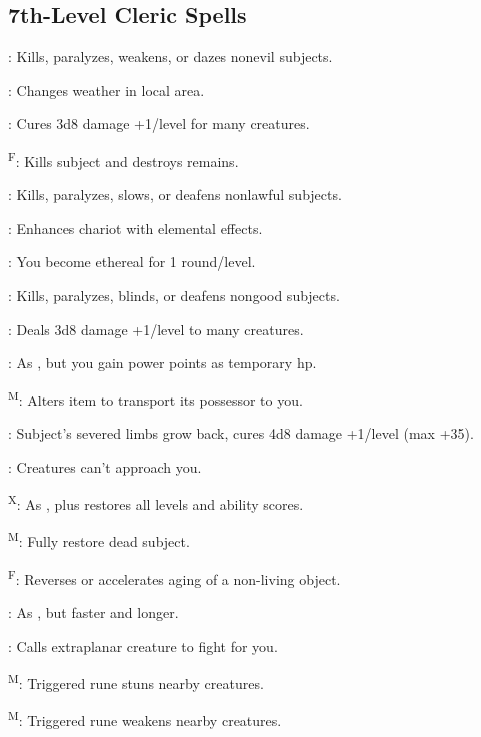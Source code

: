 \subsection{7th-Level Cleric Spells}

: Kills, paralyzes, weakens, or dazes nonevil subjects.

: Changes weather in local area.

: Cures 3d8 damage +1/level for many creatures.

\textsuperscript{F}: Kills subject and destroys remains.

: Kills, paralyzes, slows, or deafens nonlawful subjects.

: Enhances chariot with elemental effects. %

: You become ethereal for 1 round/level.

: Kills, paralyzes, blinds, or deafens nongood subjects.

: Deals 3d8 damage +1/level to many creatures.

: As , but you gain power points as temporary hp.

\textsuperscript{M}: Alters item to transport its possessor to you.

: Subject's severed limbs grow back, cures 4d8 damage +1/level (max +35).

: Creatures can't approach you.

\textsuperscript{X}: As , plus restores all levels and ability scores.

\textsuperscript{M}: Fully restore dead subject.

\textsuperscript{F}: Reverses or accelerates aging of a non-living object. %

: As , but faster and longer.

: Calls extraplanar creature to fight for you.

\textsuperscript{M}: Triggered rune stuns nearby creatures.

\textsuperscript{M}: Triggered rune weakens nearby creatures.

